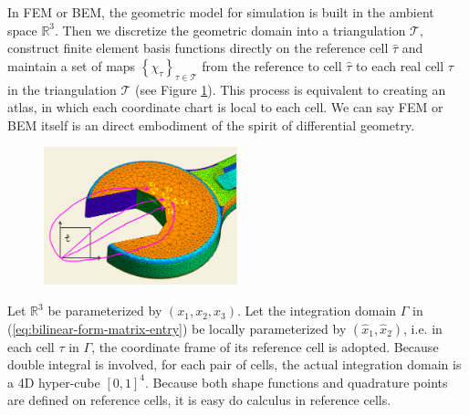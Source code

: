 \documentclass[11pt, a4paper]{article}
\begin{document}
In FEM or BEM, the geometric model for simulation is built in the ambient space
$\mathbb{R}^3$. Then we discretize the geometric domain into a triangulation
$\mathcal{T}$, construct finite element basis functions directly on the reference cell
$\hat{\tau}$ and maintain a set of maps
$\left\{ \chi_{\tau} \right\}_{\tau\in\mathcal{T}}$ from the reference to cell
$\hat{\tau}$ to each real cell $\tau$ in the triangulation $\mathcal{T}$ (see Figure
\ref{fig:mesh-manifold}). This process is equivalent to creating an atlas, in which each
coordinate chart is local to each cell. We can say FEM or BEM itself is an direct
embodiment of the spirit of differential geometry.
\begin{figure}[htbp]
  \centering
  \includegraphics[width=0.5\textwidth, height=\textheight, keepaspectratio]{figures/coordinate-chart-for-mesh-draft}
  \caption{}
  \label{fig:mesh-manifold}
\end{figure}

Let $\mathbb{R}^3$ be parameterized by $(x_1,x_2,x_3)$. Let the integration domain
$\Gamma$ in (\ref{eq:bilinear-form-matrix-entry}) be locally parameterized by
$(\hat{x}_1,\hat{x}_2)$, i.e. in each cell $\tau$ in $\Gamma$, the coordinate frame of its
reference cell is adopted. Because double integral is involved, for each pair of cells, the actual integration
domain is a 4D hyper-cube $[0,1]^4$. Because both shape functions and quadrature points
are defined on reference cells, it is easy do calculus in reference cells.
\end{document}
